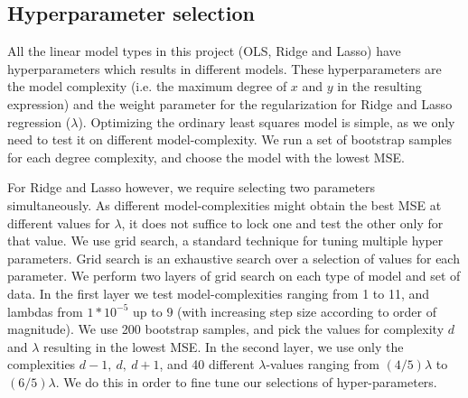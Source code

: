 \subsection{Hyperparameter selection}
All the linear model types in this project (OLS, Ridge and Lasso) have hyperparameters which results in different models. 
These hyperparameters are the model complexity (i.e. the maximum degree of $x$ and $y$ in the resulting expression) and the weight parameter for the regularization for Ridge and Lasso regression ($\lambda$). 
Optimizing the ordinary least squares model is simple, as we only need to test it on different model-complexity. 
We run a set of bootstrap samples for each degree complexity, and choose the model with the lowest MSE.

For Ridge and Lasso however, we require selecting two parameters simultaneously. As different model-complexities might obtain the best MSE at different values for $\lambda$, it does not suffice to lock one and test the other only for that value. 
We use grid search, a standard technique for tuning multiple hyper parameters. \citep[p. 302]{grid_search} 
Grid search is an exhaustive search over a selection of values for each parameter. 
We perform two layers of grid search on each type of model and set of data. 
In the first layer we test model-complexities ranging from 1 to 11, and lambdas from $1*10^{-5}$ up to $9$ (with increasing step size according to order of magnitude). 
We use 200 bootstrap samples, and pick the values for complexity $d$ and $\lambda$ resulting in the lowest MSE. 
In the second layer, we use only the complexities $d-1,\ d,\ d+1$, and 40 different $\lambda$-values ranging from $(4/5)\lambda$ to $(6/5)\lambda$. 
We do this in order to fine tune our selections of hyper-parameters.
